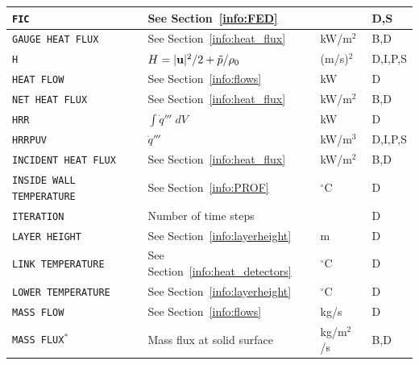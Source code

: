 \documentclass[11pt]{book}
\newcommand{\ct}{\tt\small}
\newcommand{\bu}{{\bf u}}
\newcommand{\tp}{\tilde{p}}
\newcommand{\dq}{\dot{q}}
\begin{document}
\begin{longtable}{@{\extracolsep{\fill}}|l|l|l|l|}
{\ct FIC}                                       & See Section~\ref{info:FED}                    &                & D,S          \\ \hline
{\ct GAUGE HEAT FLUX}                           & See Section~\ref{info:heat_flux}              & kW/m$^2$       & B,D          \\ \hline
{\ct H}                                         & $H=|\bu|^2/2 + \tp/\rho_0$                    & (m/s)$^2$      & D,I,P,S      \\ \hline
{\ct HEAT FLOW}                                 & See Section~\ref{info:flows}                  & kW             & D            \\ \hline
{\ct NET HEAT FLUX}                             & See Section~\ref{info:heat_flux}              & kW/m$^2$       & B,D          \\ \hline
{\ct HRR}                                       & $\int \dq''' \; dV$                           & kW             & D            \\ \hline
{\ct HRRPUV}                                    & $\dq'''$                                      & kW/m$^3$       & D,I,P,S      \\ \hline
{\ct INCIDENT HEAT FLUX}                        & See Section~\ref{info:heat_flux}              & kW/m$^2$       & B,D          \\ \hline
{\ct INSIDE WALL TEMPERATURE}                   & See Section~\ref{info:PROF}                   & $^\circ$C      & D            \\ \hline
{\ct ITERATION}                                 & Number of time steps                          &                & D            \\ \hline
{\ct LAYER HEIGHT}                              & See Section~\ref{info:layerheight}            & m              & D            \\ \hline
{\ct LINK TEMPERATURE}                          & See Section~\ref{info:heat_detectors}         & $^\circ$C      & D            \\ \hline
{\ct LOWER TEMPERATURE}                         & See Section~\ref{info:layerheight}            & $^\circ$C      & D            \\ \hline
{\ct MASS FLOW}                                 & See Section~\ref{info:flows}                  & kg/s           & D            \\ \hline
{\ct MASS FLUX}$^*$                             & Mass flux at solid surface                    & kg/m$^2$/s     & B,D          \\ \hline

\end{longtable}
\end{document}
